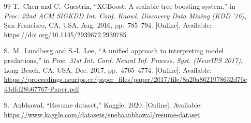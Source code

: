 \documentclass[conference]{IEEEtran}
\begin{document}
\begin{thebibliography}{99}
T.~Chen and C.~Guestrin,
``XGBoost: A scalable tree boosting system,''
in \textit{Proc. 22nd ACM SIGKDD Int. Conf. Knowl. Discovery Data Mining
(KDD '16)}, San Francisco, CA, USA, Aug. 2016, pp.~785--794.
[Online]. Available: \url{https://doi.org/10.1145/2939672.2939785}

S.~M.~Lundberg and S.-I.~Lee,
``A unified approach to interpreting model predictions,''
in \textit{Proc. 31st Int. Conf. Neural Inf. Process. Syst. (NeurIPS 2017)},
Long Beach, CA, USA, Dec. 2017, pp.~4765--4774.
[Online]. Available: \url{https://proceedings.neurips.cc/paper_files/paper/2017/file/8a20a8621978632d76c43dfd28b67767-Paper.pdf}

S.~Anbhawal,
``Resume dataset,'' Kaggle, 2020.
[Online]. Available: \url{https://www.kaggle.com/datasets/snehaanbhawal/resume-dataset}

\end{thebibliography}
\end{document}
